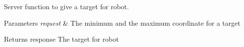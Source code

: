 Server function to give a target for robot. 


\begin{DoxyParams}{Parameters}
{\em request} & The minimum and the maximum coordinate for a target \\
\hline
\end{DoxyParams}
\begin{DoxyReturn}{Returns}
response The target for robot 
\end{DoxyReturn}
